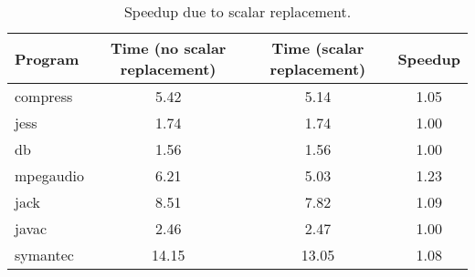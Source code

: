 \begin{table}
\begin{center}
\begin{tabular}{||l|c|c|c||}			\hline
{\bf Program}				& 
{\bf Time (no scalar replacement)}	& 
{\bf Time (scalar replacement)}		& 
{\bf Speedup}			\\ \hline
%

compress & 5.42 & 5.14 & 1.05 \\
jess & 1.74 & 1.74 & 1.00 \\
db & 1.56 & 1.56 & 1.00 \\
mpegaudio & 6.21 & 5.03 & 1.23 \\
jack & 8.51 & 7.82 & 1.09 \\
javac & 2.46 & 2.47 & 1.00 \\
symantec & 14.15 & 13.05 & 1.08 \\ \hline

\end{tabular}
\end{center}
  \caption{Speedup due to scalar replacement.}
  \label{table:speedup}
\end{table}

